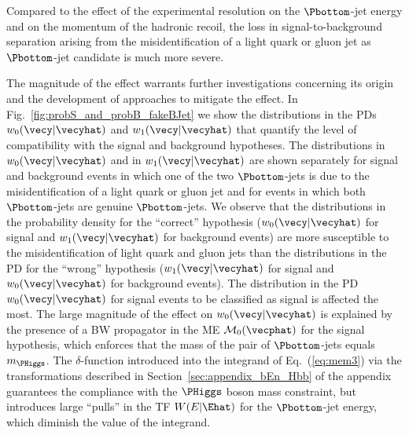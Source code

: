 Compared to the effect of the experimental resolution on the $\Pbottom$-jet energy and on the momentum of the hadronic recoil,
the loss in signal-to-background separation arising from the misidentification of a light quark or gluon jet as $\Pbottom$-jet candidate
is much more severe. 

The magnitude of the effect warrants further investigations concerning its origin and the development of approaches to mitigate the effect.
In Fig.~\ref{fig:probS_and_probB_fakeBJet} we show the distributions in the PDs $w_{0}(\vecy|\vecyhat)$ and $w_{1}(\vecy|\vecyhat)$
that quantify the level of compatibility with the signal and background hypotheses.
The distributions in $w_{0}(\vecy|\vecyhat)$ and in $w_{1}(\vecy|\vecyhat)$ are shown separately 
for signal and background events in which one of the two $\Pbottom$-jets is due to the misidentification of a light quark or gluon jet
and for events in which both $\Pbottom$-jets are genuine $\Pbottom$-jets.
We observe that the distributions in the probability density for the ``correct'' hypothesis 
($w_{0}(\vecy|\vecyhat)$ for signal and $w_{1}(\vecy|\vecyhat)$ for background events)
are more susceptible to the misidentification of light quark and gluon jets than the distributions in the PD for the ``wrong'' hypothesis 
($w_{1}(\vecy|\vecyhat)$ for signal and $w_{0}(\vecy|\vecyhat)$ for background events).
The distribution in the PD $w_{0}(\vecy|\vecyhat)$ for signal events to be classified as signal is affected the most.
The large magnitude of the effect on $w_{0}(\vecy|\vecyhat)$ is explained by the presence of a BW propagator in the ME $\mathcal{M}_{0}(\vecphat)$ for the signal hypothesis,
which enforces that the mass of the pair of $\Pbottom$-jets equals $m_{\PHiggs}$.
The $\delta$-function introduced into the integrand of Eq.~(\ref{eq:mem3}) via the transformations described in Section~\ref{sec:appendix_bEn_Hbb} of the appendix
guarantees the compliance with the $\PHiggs$ boson mass constraint,
but introduces large ``pulls'' in the TF $W(E|\Ehat)$ for the $\Pbottom$-jet energy,
which diminish the value of the integrand.

